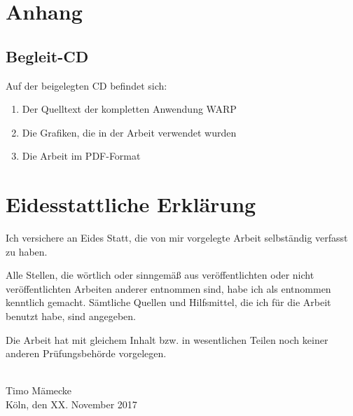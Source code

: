 
\chapter{Anhang}

\section{Begleit-CD}

Auf der beigelegten CD befindet sich:

\begin{enumerate}
  \item Der Quelltext der kompletten Anwendung WARP
  \item Die Grafiken, die in der Arbeit verwendet wurden
  \item Die Arbeit im PDF-Format
\end{enumerate}

\chapter*{Eidesstattliche Erklärung}

Ich versichere an Eides Statt, die von mir vorgelegte Arbeit selbständig verfasst zu haben.

Alle Stellen, die wörtlich oder sinngemäß aus veröffentlichten oder nicht veröffentlichten Arbeiten anderer entnommen sind, habe ich als entnommen kenntlich gemacht. Sämtliche Quellen und Hilfsmittel, die ich für die Arbeit benutzt habe, sind angegeben.

Die Arbeit hat mit gleichem Inhalt bzw. in wesentlichen Teilen noch keiner anderen Prüfungsbehörde vorgelegen.

\vspace{3cm}

\makebox[.5\textwidth][r]{\hrulefill} \\
Timo Mämecke \\
Köln, den XX. November 2017

